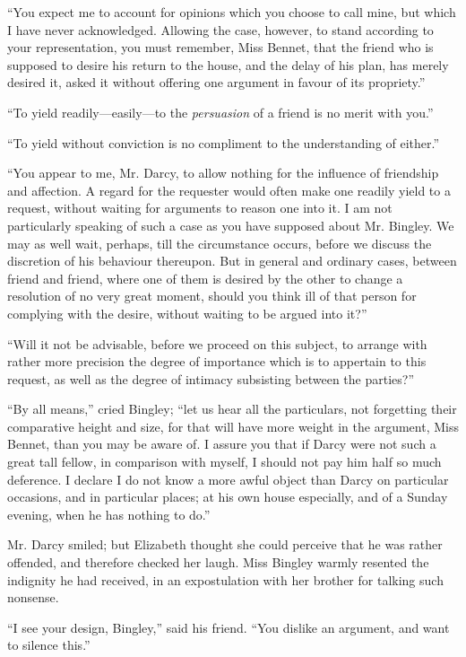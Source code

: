 \documentclass[12pt]{book}
\begin{document}
``You expect me to account for opinions which you choose to call mine, but which I have never acknowledged. Allowing the case, however, to stand according to your representation, you must remember, Miss Bennet, that the friend who is supposed to desire his return to the house, and the delay of his plan, has merely desired it, asked it without offering one argument in favour of its propriety.''

``To yield readily---easily---to the \textit{persuasion} of a friend is no merit with you.''

``To yield without conviction is no compliment to the understanding of either.''

``You appear to me, Mr. Darcy, to allow nothing for the influence of friendship and affection. A regard for the requester would often make one readily yield to a request, without waiting for arguments to reason one into it. I am not particularly speaking of such a case as you have supposed about Mr. Bingley. We may as well wait, perhaps, till the circumstance occurs, before we discuss the discretion of his behaviour thereupon. But in general and ordinary cases, between friend and friend, where one of them is desired by the other to change a resolution of no very great moment, should you think ill of that person for complying with the desire, without waiting to be argued into it?''

``Will it not be advisable, before we proceed on this subject, to arrange with rather more precision the degree of importance which is to appertain to this request, as well as the degree of intimacy subsisting between the parties?''

``By all means,'' cried Bingley; ``let us hear all the particulars, not forgetting their comparative height and size, for that will have more weight in the argument, Miss Bennet, than you may be aware of. I assure you that if Darcy were not such a great tall fellow, in comparison with myself, I should not pay him half so much deference. I declare I do not know a more awful object than Darcy on particular occasions, and in particular places; at his own house especially, and of a Sunday evening, when he has nothing to do.''

Mr. Darcy smiled; but Elizabeth thought she could perceive that he was rather offended, and therefore checked her laugh. Miss Bingley warmly resented the indignity he had received, in an expostulation with her brother for talking such nonsense.

``I see your design, Bingley,'' said his friend. ``You dislike an argument, and want to silence this.''
\end{document}

